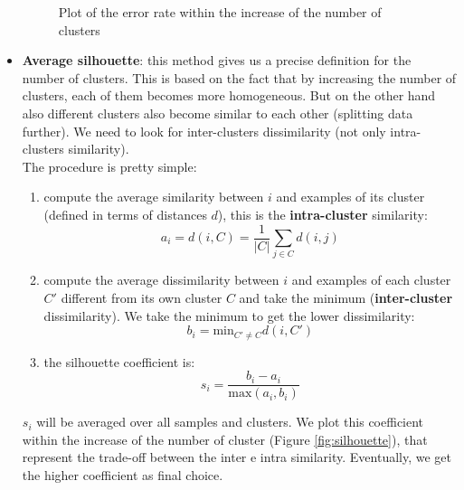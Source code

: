 \begin{itemize}
\begin{figure}
                    \caption{Plot of the error rate within the increase of the number of clusters}
                    \label{fig:elbow_method}
                \end{figure}
                \item \textbf{Average silhouette}: this method gives us a precise definition for the number of clusters. This is based on the fact that by increasing the number of clusters, each of them becomes more homogeneous. But on the other hand also different clusters also become similar to each other (splitting data further). We need to look for inter-clusters dissimilarity (not only intra-clusters similarity).\\
                The procedure is pretty simple:
                \begin{enumerate}
                    \item compute the average similarity between $i$ and examples of its cluster (defined in terms of distances $d$), this is the \textbf{intra-cluster} similarity: 
                    $$a_i = d(i, C) = \frac{1}{|C|} \sum_{j \in C} d(i, j)$$
                    \item compute the average dissimilarity between $i$ and examples of each cluster $C'$ different from its own cluster $C$ and take the minimum (\textbf{inter-cluster} dissimilarity). We take the minimum to get the lower dissimilarity:
                    $$b_i = \text{min}_{C' \neq C} d(i, C')$$
                    \item the silhouette coefficient is:
                    $$s_i = \frac{b_i - a_i}{\text{max}(a_i, b_i)}$$
                \end{enumerate}
                $s_i$ will be averaged over all samples and clusters. We plot this coefficient within the increase of the number of cluster (Figure \ref{fig:silhouette}), that represent the trade-off between the inter e intra similarity. Eventually, we get the higher coefficient as final choice.
                \begin{figure}[ht]
                    \centering

\end{figure}
\end{itemize}
